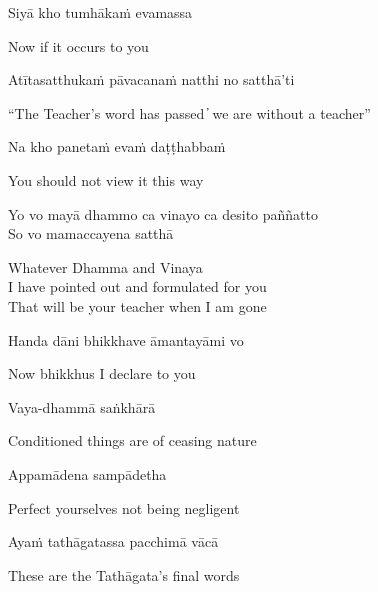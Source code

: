 \begin{leader}
\end{leader}

Siyā kho tumhākaṁ evamassa

\begin{cprenglish}
  Now if it occurs to you
\end{cprenglish}

Atītasatthukaṁ pāvacanaṁ natthi no satthā’ti

\begin{cprenglish}
  “The Teacher’s word has passed  ̓  we are without a teacher”
\end{cprenglish}

Na kho panetaṁ evaṁ daṭṭhabbaṁ

\begin{cprenglish}
  You should not view it this way
\end{cprenglish}

Yo vo mayā dhammo ca vinayo ca desito paññatto\\
So vo mamaccayena satthā

\begin{cprenglish}
  Whatever Dhamma and Vinaya\\
  I have pointed out and formulated for you\\
  That will be your teacher when I am gone
\end{cprenglish}

Handa dāni bhikkhave āmantayāmi vo

\begin{cprenglish}
  Now bhikkhus I declare to you
\end{cprenglish}

Vaya-dhammā saṅkhārā

\begin{cprenglish}
  Conditioned things are of ceasing nature
\end{cprenglish}

Appamādena sampādetha

\begin{cprenglish}
  Perfect yourselves not being negligent
\end{cprenglish}

Ayaṁ tathāgatassa pacchimā vācā

\begin{cprenglish}
  These are the Tathāgata’s final words
\end{cprenglish}


\clearpage
